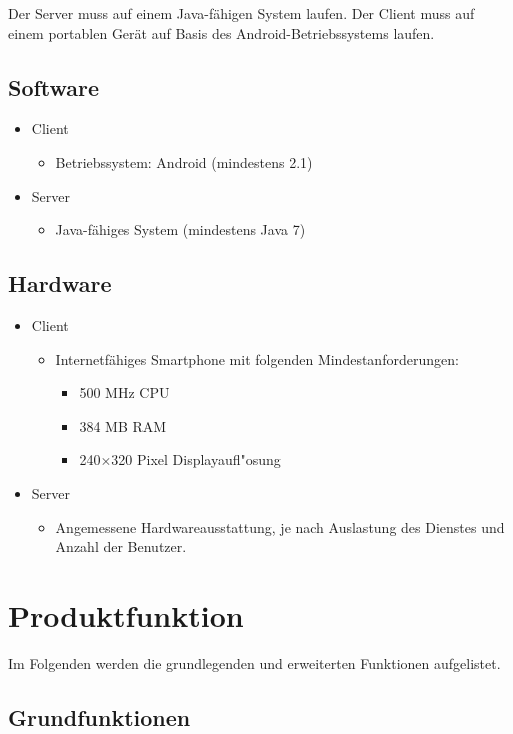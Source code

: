 \documentclass[a4paper,10pt]{scrartcl}
\begin{document}
Der Server muss auf einem Java-fähigen System laufen.
Der Client muss auf einem portablen Gerät auf Basis des Android-Betriebssystems laufen.

\subsection{Software}
\begin{itemize}
\item Client
   \begin{itemize}
      \item Betriebssystem: Android (mindestens 2.1)
   \end{itemize}
\item Server
   \begin{itemize}
      \item Java-fähiges System (mindestens Java 7)
   \end{itemize}
\end{itemize}

\subsection{Hardware}
\begin{itemize}
\item Client
   \begin{itemize}
      \item Internetfähiges Smartphone mit folgenden Mindestanforderungen:
         \begin{itemize}
         \item 500 MHz CPU
         \item 384 MB RAM
         \item 240$\times$320 Pixel Displayaufl"osung
      \end{itemize}
   \end{itemize}
\item Server
   \begin{itemize}
      \item Angemessene Hardwareausstattung, je nach Auslastung des Dienstes und
            Anzahl der Benutzer.
   \end{itemize}
\end{itemize}

\section{Produktfunktion}
Im Folgenden werden die grundlegenden und erweiterten Funktionen aufgelistet.
\subsection{Grundfunktionen}
\end{document}
